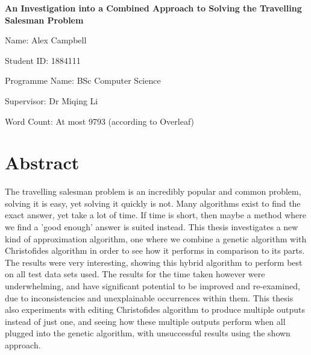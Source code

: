 \documentclass[11pt,a4paper,titlepage]{article}
\author{Alex Campbell}
\date{}
\begin{document}
\begin{titlepage}
	\begin{center}
	\vspace*{1cm}
	
	\textbf{An Investigation into a Combined Approach to Solving the Travelling Salesman Problem}
	
	\vspace{1.5cm}

	Name: Alex Campbell
	
	Student ID: 1884111
	
	Programme Name: BSc Computer Science
	
	\vspace{1cm}	
	
	Supervisor: Dr Miqing Li
	
	\vspace{1cm}	
	
	Word Count: At most 9793 (according to Overleaf)
	
	\end{center}
\end{titlepage}
\setlength{\parindent}{0em}
\setlength{\parskip}{1em}


\section*{Abstract}

The travelling salesman problem is an incredibly popular and common problem, solving it is easy, yet solving it quickly is not. Many algorithms exist to find the exact answer, yet take a lot of time. If time is short, then maybe a method where we find a 'good enough' answer is suited instead. This thesis investigates a new kind of approximation algorithm, one where we combine a genetic algorithm with Christofides algorithm in order to see how it performs in comparison to its parts. The results were very interesting, showing this hybrid algorithm to perform best on all test data sets used. The results for the time taken however were underwhelming, and have significant potential to be improved and re-examined, due to inconsistencies and unexplainable occurrences within them. This thesis also experiments with editing Christofides algorithm to produce multiple outputs instead of just one, and seeing how these multiple outputs perform when all plugged into the genetic algorithm, with unsuccessful results using the shown approach.

\pagebreak

\tableofcontents
\pagebreak
\end{document}
